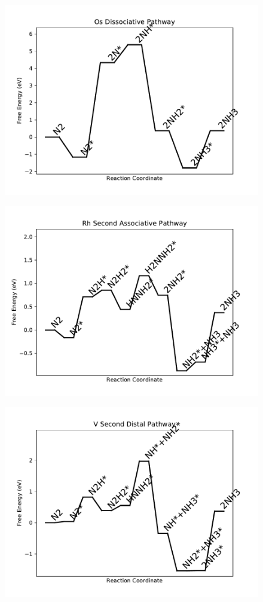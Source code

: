 \begin{figure}
\centering
\includegraphics[width=0.8\linewidth]{data/plots/Os_dissociative.pdf}
\end{figure}

\begin{figure}
\centering
\includegraphics[width=0.8\linewidth]{data/plots/Rh_associative_2.pdf}
\end{figure}

\begin{figure}
\centering
\includegraphics[width=0.8\linewidth]{data/plots/V_distal_2.pdf}
\end{figure}

